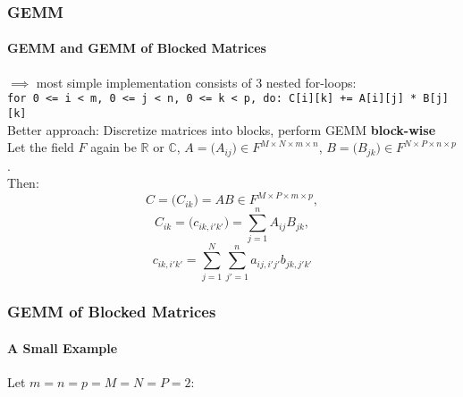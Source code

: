 \begin{frame}
\frametitle{GEMM}
\framesubtitle{GEMM and GEMM of Blocked Matrices}
\(\implies\) most simple implementation consists of 3 nested for-loops: \\
\vspace{0.005cm}\texttt{for 0 <= i < m, 0 <= j < n, 0 <= k < p, do: C[i][k] += A[i][j] * B[j][k]}\\
\vspace{0.25cm}Better approach: Discretize matrices into blocks, perform GEMM \textbf{block-wise}\\
\vspace{0.005cm}Let the field \(F\) again be \(\mathbb{R}\) or \(\mathbb{C}\),
\(A =\big( A_{ij} \big) \in F^{M \times N \times m \times n}\),
\(B =\big( B_{jk} \big) \in F^{N \times P \times n \times p}\).\\
\vspace{0.005cm}Then:
\begin{equation}
 C=\big( C_{ik} \big)=AB \in F^{M \times P \times m \times p},
\end{equation}
\begin{equation}
 C_{ik} = \big( c_{ik,i'k'} \big) = \sum_{j=1}^n{A_{ij}B_{jk}},
\end{equation}
\begin{equation}
 c_{ik,i'k'} = \sum_{j=1}^N{\sum_{j'=1}^n{a_{ij,i'j'}b_{jk,j'k'}}}
\end{equation}
\end{frame}

\begin{frame}
\frametitle{GEMM of Blocked Matrices}
\framesubtitle{A Small Example}
Let \(m = n = p = M = N = P = 2\):
\vspace{0.3cm}
\begin{center}
\end{center}
\end{frame}

